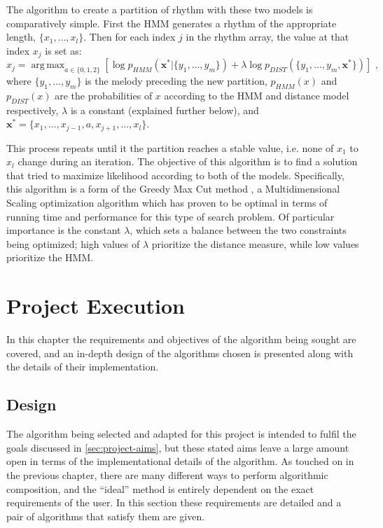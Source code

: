 \documentclass[ author={Stephen Livermore-Tozer},
				supervisor={Dr. Peter Flach},
				degree={MEng},
				title={Algorithmic Co-composition Using Machine Learning},
				subtitle={},
				type={research},
				year={2016} ]{dissertation}
\DeclareMathOperator*{\argmax}{arg\,max}
\begin{document}
	The algorithm to create a partition of rhythm with these two models is comparatively simple. First the HMM generates a rhythm of the appropriate length, $\{x_1,\dots,x_l\}$. Then for each index $j$ in the rhythm array, the value at that index $x_j$ is set as:
	$$ x_j = \argmax_{a \in \{0,1,2\}} \left[ \log p_{HMM}(\mathbf{x^*} | \{y_1,\dots,y_m\}) + \lambda \log p_{DIST}(\{y_1,\dots,y_m,\mathbf{x^*}\}) \right] \text{ ,}$$
	where $\{y_1,\dots,y_m\}$ is the melody preceding the new partition, $p_{HMM}(x)$ and $p_{DIST}(x)$ are the probabilities of $x$ according to the HMM and distance model respectively, $\lambda$ is a constant (explained further below), and $\mathbf{x^*} = \{x_1,\dots,x_{j-1},a,x_{j+1},\dots,x_l\}$.
	
	This process repeats until it the partition reaches a stable value, i.e. none of $x_1$ to $x_l$ change during an iteration. The objective of this algorithm is to find a solution that tried to maximize likelihood according to both of the models. Specifically, this algorithm is a form of the Greedy Max Cut method \cite{rohde2002methods}, a Multidimensional Scaling optimization algorithm which has proven to be optimal in terms of running time and performance for this type of search problem. Of particular importance is the constant $\lambda$, which sets a balance between the two constraints being optimized; high values of $\lambda$ prioritize the distance measure, while low values prioritize the HMM.
	
	
	\chapter{Project Execution}
	\label{chap:execution}
	
	In this chapter the requirements and objectives of the algorithm being sought are covered, and an in-depth design of the algorithms chosen is presented along with the details of their implementation.
	
	\section{Design}
	
	The algorithm being selected and adapted for this project is intended to fulfil the goals discussed in \ref{sec:project-aims}, but these stated aims leave a large amount open in terms of the implementational details of the algorithm. As touched on in the previous chapter, there are many different ways to perform algorithmic composition, and the ``ideal'' method is entirely dependent on the exact requirements of the user. In this section these requirements are detailed and a pair of algorithms that satisfy them are given. 
	
\end{document}
